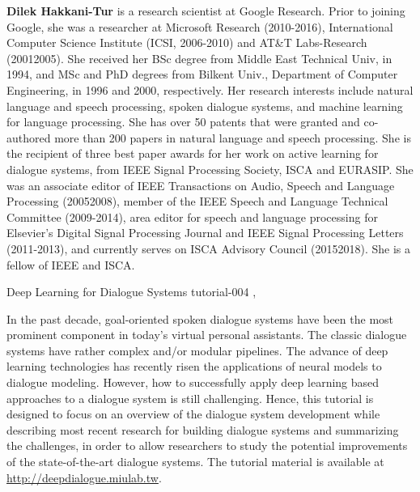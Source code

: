 \begin{bio}
  {\bfseries Dilek Hakkani-Tur} is a research scientist at Google Research. Prior to joining Google, she was a researcher at Microsoft Research (2010-2016), International Computer Science Institute (ICSI, 2006-2010) and AT\&T Labs-Research (20012005). She received her BSc degree from Middle East Technical Univ, in 1994, and MSc and PhD degrees from Bilkent Univ., Department of Computer Engineering, in 1996 and 2000, respectively. Her research interests include natural language and speech processing, spoken dialogue systems, and machine learning for language processing. She has over 50 patents that were granted and co-authored more than 200 papers in natural language and speech processing. She is the recipient of three best paper awards for her work on active learning for dialogue systems, from IEEE Signal Processing Society, ISCA and EURASIP. She was an associate editor of IEEE Transactions on Audio, Speech and Language Processing (20052008), member of the IEEE Speech and Language Technical Committee (2009-2014), area editor for speech and language processing for Elsevier’s Digital Signal Processing Journal and IEEE Signal Processing Letters (2011-2013), and currently serves on ISCA Advisory Council (20152018). She is a fellow of IEEE and ISCA. 
\end{bio}

\begin{tutorial}
  {Deep Learning for Dialogue Systems}
  {tutorial-004}
  {\daydateyear, \tutorialafternoontime}
  {\TutLocD}

In the past decade, goal-oriented spoken dialogue systems have been the most prominent component in today's virtual personal assistants. The classic dialogue systems have rather complex and/or modular pipelines. The advance of deep learning technologies has recently risen the applications of neural models to dialogue modeling. However, how to successfully apply deep learning based approaches to a dialogue system is still challenging. Hence, this tutorial is designed to focus on an overview of the dialogue system development while describing most recent research for building dialogue systems and summarizing the challenges, in order to allow researchers to study the potential improvements of the state-of-the-art dialogue systems. The tutorial material is available at \url{http://deepdialogue.miulab.tw}.
\end{tutorial}
